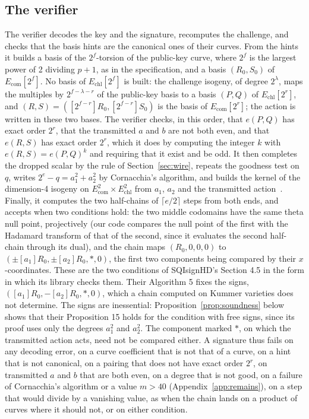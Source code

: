 \documentclass[version=preprint]{iacrcc}
\newcommand{\Ecom}{E_{\mathrm{com}}}
\newcommand{\Echl}{E_{\mathrm{chl}}}
\begin{document}
    \subsection{The verifier}
    \label{sec:verif}
    The verifier decodes the key and the signature, recomputes the challenge,
    and checks that the basis hints are the canonical ones of their curves. From the hints it builds a basis of the $2^f$-torsion of the public-key curve,
    where $2^f$ is the largest power of 2 dividing $p + 1$, as in the
    specification, and a basis $(R_0, S_0)$ of $\Ecom[2^f]$. No basis of
    $\Echl[2^f]$ is built: the challenge isogeny, of degree $2^\lambda$, maps
    the multiples by $2^{f - \lambda - r}$ of the public-key basis to a basis
    $(P, Q)$ of $\Echl[2^r]$, and $(R, S) = ([2^{f-r}]R_0, [2^{f-r}]S_0)$ is
    the basis of $\Ecom[2^r]$; the action is written in these two bases. The
    verifier checks, in this order, that $e(P, Q)$ has exact order $2^r$, that
    the transmitted $a$ and $b$ are not both even, and that $e(R, S)$ has
    exact order $2^r$, which it does by computing the integer $k$ with $e(R,
    S) = e(P, Q)^k$ and requiring that it exist and be odd. It
    then completes the dropped scalar by the rule of Section~\ref{sec:wire},
    repeats the goodness test on $q$, writes $2^e - q = a_1^2 + a_2^2$ by
    Cornacchia's algorithm, and builds the kernel of the dimension-4 isogeny
    on $\Ecom^2 \times \Echl^2$ from $a_1$, $a_2$ and the transmitted
    action~\cite[Lemma 4 and Section 4.4]{DLRW24}. Finally, it computes the two
    half-chains of $\lceil e/2 \rceil$ steps from both ends, and accepts when
    two conditions hold: the two middle codomains have the same theta null
    point, projectively (our code compares the null point of the first with
    the Hadamard transform of that of the second, since it evaluates the
    second half-chain through its dual), and the chain maps $(R_0, 0, 0, 0)$ to $(\pm[a_1]R_0,
    \pm[a_2]R_0, \ast, 0)$, the first two components being compared by their
    $x$-coordinates. These are the two conditions of SQIsignHD's Section 4.5
    in the form in which its library checks them. Their Algorithm 5 fixes the
    signs, $([a_1]R_0, -[a_2]R_0, \ast, 0)$, which a chain computed on Kummer
    varieties does not determine. The signs are inessential:
    Proposition~\ref{prop:soundness} below shows that their Proposition 15
    holds for the condition with free signs, since its proof uses only the
    degrees $a_1^2$ and $a_2^2$. The component marked $\ast$, on which the
    transmitted action acts, need not be compared either. A signature thus
    fails on any decoding error, on a curve coefficient that is not that of a
    curve, on a hint that is not canonical, on a pairing that does not have
    exact order $2^r$, on transmitted $a$ and $b$ that are both even, on a
    degree that is not good, on a failure of Cornacchia's algorithm or a
    value $m > 40$ (Appendix~\ref{app:remains}), on a step that would divide
    by a vanishing value, as when the chain lands on a product of curves
    where it should not, or on either condition.
\end{document}
